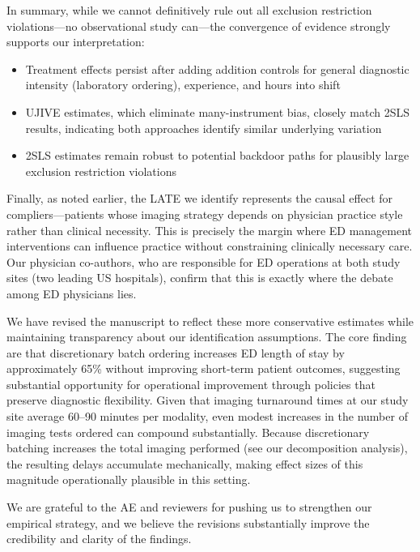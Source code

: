 \documentclass[11pt]{article}
\newcommand{\1}{\hbox{\rm 1\kern-.35em 1}}
\begin{document}
In summary, while we cannot definitively rule out all exclusion restriction violations---no observational study can---the convergence of evidence strongly supports our interpretation:

\begin{itemize}
\item Treatment effects persist after adding addition controls for general diagnostic intensity (laboratory ordering), experience, and hours into shift
\item UJIVE estimates, which eliminate many-instrument bias, closely match 2SLS results, indicating both approaches identify similar underlying variation
\item 2SLS estimates remain robust to potential backdoor paths for plausibly large exclusion restriction violations
\end{itemize}

Finally, as noted earlier, the LATE we identify represents the causal effect for compliers---patients whose imaging strategy depends on physician practice style rather than clinical necessity. This is precisely the margin where ED management interventions can influence practice without constraining clinically necessary care. Our physician co-authors, who are responsible for ED operations at both study sites (two leading US hospitals), confirm that this is exactly where the debate among ED physicians lies.

We have revised the manuscript to reflect these more conservative estimates while maintaining transparency about our identification assumptions. The core finding are that discretionary batch ordering increases ED length of stay by approximately 65\% without improving short-term patient outcomes, suggesting substantial opportunity for operational improvement through policies that preserve diagnostic flexibility. Given that imaging turnaround times at our study site average 60–90 minutes per modality, even modest increases in the number of imaging tests ordered can compound substantially. Because discretionary batching increases the total imaging performed (see our decomposition analysis), the resulting delays accumulate mechanically, making effect sizes of this magnitude operationally plausible in this setting.

We are grateful to the AE and reviewers for pushing us to strengthen our empirical strategy, and we believe the revisions substantially improve the credibility and clarity of the findings.

\color{black}
\end{document}
